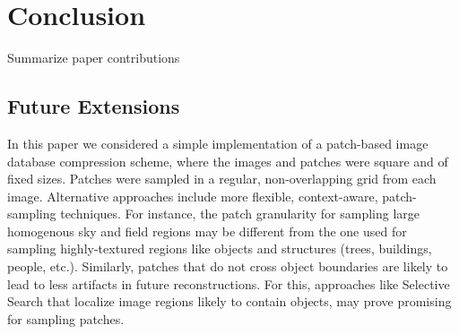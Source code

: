 \section{Conclusion}

\begin{edit}
Summarize paper contributions
\end{edit}

\subsection{Future Extensions}
\label{sec:futureext}

In this paper we considered a simple implementation of a patch-based image database compression scheme, where the images and patches were square and of fixed sizes. Patches were sampled in a regular, non-overlapping grid from each image.  Alternative approaches include more flexible, context-aware, patch-sampling techniques. For instance, the patch granularity for sampling large homogenous sky and field regions may be different from the one used for sampling highly-textured regions like objects and structures (trees, buildings, people, etc.). Similarly, patches that do not cross object boundaries are likely to lead to less artifacts in future reconstructions. For this, approaches like Selective Search \cite{UijlingsIJCV2013} that localize image regions likely to contain objects, may prove promising for sampling patches.
